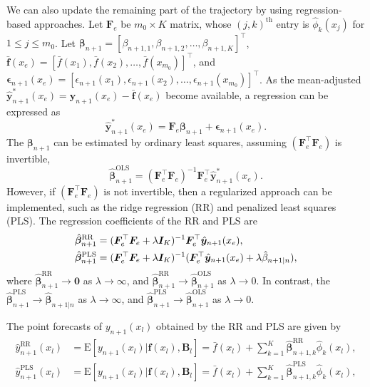 \documentclass[nojss]{jss}
\begin{document}
We can also update the remaining part of the trajectory by using regression-based approaches. Let $\bm{F}_e$ be $m_0\times K$ matrix, whose $(j,k)^{\text{th}}$ entry is $\hat{\phi}_k(x_j)$ for $1\leq j\leq m_0$. Let $\bm{\beta}_{n+1}=[\beta_{n+1,1},\beta_{n+1,2},\dots,\beta_{n+1,K}]^{\top}$, $\bm{\bar{f}}(x_e)=[\bar{f}(x_1),\bar{f}(x_2),\dots,\bar{f}(x_{m_0})]^{\top}$, and $\bm{\epsilon}_{n+1}(x_e)=[\epsilon_{n+1}(x_1),\epsilon_{n+1}(x_2),\dots,\epsilon_{n+1}(x_{m_0})]^{\top}$. As the mean-adjusted $\hat{\bm{y}}_{n+1}^*(x_e)=\bm{y}_{n+1}(x_e)-\bm{\bar{f}}(x_e)$ become available, a regression can be expressed as
\begin{equation*}
  \hat{\bm{y}}_{n+1}^*(x_e) = \bm{F}_e\bm{\beta}_{n+1}+\bm{\epsilon}_{n+1}(x_e).
\end{equation*}
The $\bm{\beta}_{n+1}$ can be estimated by ordinary least squares, assuming $(\bm{F}_e^{\top}\bm{F}_e)$ is invertible,
\begin{equation*}
  \hat{\bm{\beta}}_{n+1}^{\text{OLS}}=(\bm{F}_e^{\top}\bm{F}_e)^{-1}\bm{F}_e^{\top}\hat{\bm{y}}_{n+1}^*(x_e).
\end{equation*}
However, if $(\bm{F}_e^{\top}\bm{F}_e)$ is not invertible, then a regularized approach can be implemented, such as the ridge regression (RR) and penalized least squares (PLS). The regression coefficients of the RR and PLS are
\begin{align}
  \hat{\bm{\beta}}_{n+1}^{\text{RR}}&=(\bm{F}_e^{\top}\bm{F}_e+\lambda\bm{I}_K)^{-1}\bm{F}_e^{\top}\hat{\bm{y}}_{n+1}(x_e),\notag\\
  \hat{\bm{\beta}}_{n+1}^{\text{PLS}}&=(\bm{F}_e^{\top}\bm{F}_e+\lambda\bm{I}_K)^{-1}(\bm{F}_e^{\top}\hat{\bm{y}}_{n+1}(x_e)+\lambda\hat{\beta}_{n+1|n}),\label{eq:21}
\end{align}
where $\hat{\bm{\beta}}_{n+1}^{\text{RR}} \rightarrow \bm{0}$ as $\lambda\rightarrow \infty$, and $\hat{\bm{\beta}}_{n+1}^{\text{RR}} \rightarrow \hat{\bm{\beta}}_{n+1}^{\text{OLS}}$ as $\lambda\rightarrow 0$. In contrast, the $\hat{\bm{\beta}}_{n+1}^{\text{PLS}}\rightarrow \hat{\bm{\beta}}_{n+1|n}$ as $\lambda\rightarrow \infty$, and $\hat{\bm{\beta}}_{n+1}^{\text{PLS}}\rightarrow \hat{\bm{\beta}}_{n+1}^{\text{OLS}}$ as $\lambda\rightarrow 0$.

The point forecasts of $y_{n+1}(x_l)$ obtained by the RR and PLS are given by
\begin{align*}
  \hat{y}_{n+1}^{\text{RR}}(x_l)&=\text{E}[y_{n+1}(x_l)|\bm{f}(x_l),\mathcal{\bm{B}}_l]=\bar{f}(x_l)+\sum^K_{k=1}\hat{\bm{\beta}}_{n+1,k}^{\text{RR}}\hat{\phi}_k(x_l),\\
  \hat{y}_{n+1}^{\text{PLS}}(x_l)&=\text{E}[y_{n+1}(x_l)|\bm{f}(x_l),\mathcal{\bm{B}}_l]=\bar{f}(x_l)+\sum^K_{k=1}\hat{\bm{\beta}}_{n+1,k}^{\text{PLS}}\hat{\phi}_k(x_l),
\end{align*}
\end{document}
